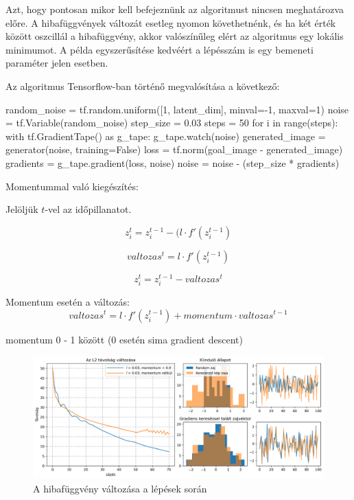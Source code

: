 Azt, hogy pontosan mikor kell befejeznünk az algoritmust nincsen meghatározva előre. A hibafüggvények változát esetleg nyomon követhetnénk, és ha két érték között oszcillál a hibafüggvény, akkor valószínűleg elért az algoritmus egy lokális minimumot. A példa egyszerűsítése kedvéért a lépésszám is egy bemeneti paraméter jelen esetben.

Az algoritmus Tensorflow-ban történő megvalósítása a következő:

\begin{python}
random_noise = tf.random.uniform([1, latent_dim], minval=-1, maxval=1)
noise = tf.Variable(random_noise)
step_size = 0.03
steps = 50
for i in range(steps):
    with tf.GradientTape() as g_tape:
        g_tape.watch(noise)
        generated_image = generator(noise, training=False)
        loss = tf.norm(goal_image - generated_image)
    gradients = g_tape.gradient(loss, noise)
    noise = noise - (step_size * gradients)
\end{python}


Momentummal való kiegészítés:

Jelöljük $t$-vel az időpillanatot.

$$ z_i^t = z_i^{t-1} - (l \cdot f'(z_i^{t-1})$$

$$ valtozas^t = l \cdot f'(z_i^{t-1}) $$

$$ z_i^t = z_i^{t-1} - valtozas^t $$


Momentum esetén a változás:
$$ valtozas^t = l \cdot f'(z_i^{t-1}) + momentum \cdot valtozas^{t-1}$$


momentum 0 - 1 között (0 esetén sima gradient descent)


\begin{figure}[h]
\centering
\includegraphics[width=15cm]{images/grad_losses.png}
\caption{A hibafüggvény változása a lépések során}
\label{fig:gradlosses}
\end{figure}


